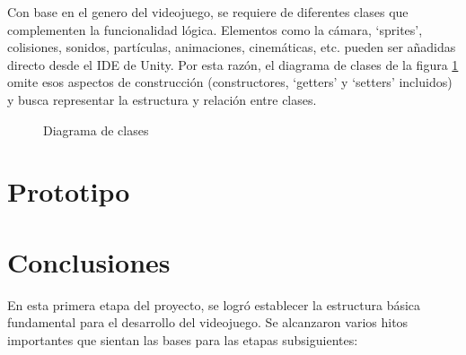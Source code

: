 \documentclass[12pt,twoside]{article}
\begin{document}
	Con base en el genero del videojuego, se requiere de diferentes clases que complementen la funcionalidad lógica. Elementos como la cámara, `sprites', colisiones, sonidos, partículas, animaciones, cinemáticas, etc. pueden ser añadidas directo desde el IDE de Unity. Por esta razón, el diagrama de clases de la figura \ref{diagrama: clases} omite esos aspectos de construcción (constructores, `getters' y `setters' incluidos) y busca representar la estructura y relación entre clases.

	\begin{figure}[H]
		\centering
		\caption{Diagrama de clases}
		\label{diagrama: clases}
	\end{figure}

	\clearpage
	
	\section{Prototipo}

	\clearpage
	
	\section{Conclusiones}
	
	En esta primera etapa del proyecto, se logró establecer la estructura básica fundamental para el desarrollo del videojuego. Se alcanzaron varios hitos importantes que sientan las bases para las etapas subsiguientes:
	
\end{document}
